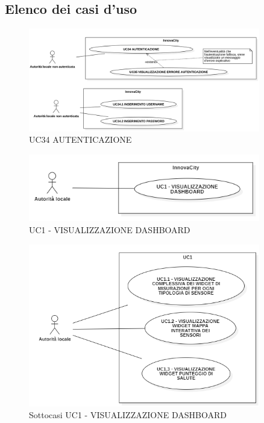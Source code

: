 \newpage

\subsection{Elenco dei casi d'uso}

\begin{figure}[H]
    \centering
    \includegraphics[width=0.9\textwidth]{../Images/UC34.png}
    \caption{UC34 AUTENTICAZIONE}
    \label{fig:UC34}
\end{figure}




\begin{figure}[H]
    \centering
    \includegraphics[width=0.9\textwidth]{../Images/uc1.png}
    \caption{UC1 - VISUALIZZAZIONE DASHBOARD}
    \label{fig:UC1}
\end{figure}




\begin{figure}[H]
    \centering
    \includegraphics[width=0.9\textwidth]{../Images/uc1_Subcase.PNG} 
    \caption{Sottocasi UC1 - VISUALIZZAZIONE DASHBOARD}
    \label{fig:UC1_sub}
\end{figure}

